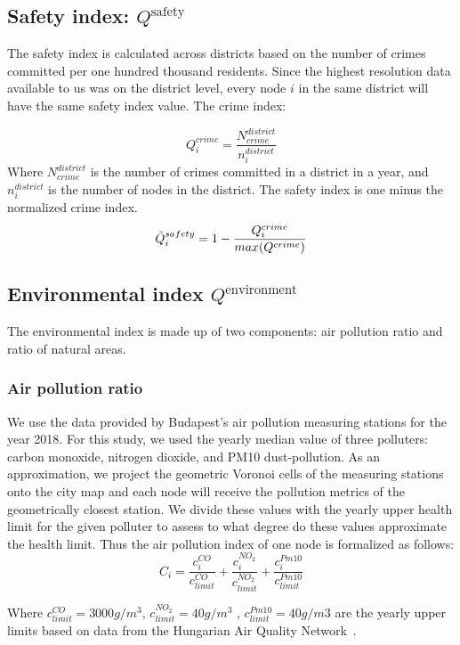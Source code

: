 \subsection{Safety index: \texorpdfstring{$Q^{\text{safety}}$}{Q\^safety}} \label{safety}

The safety index is calculated across districts based on the number of crimes committed per one hundred thousand residents. Since the highest resolution data available to us was on the district level, every node $i$ in the same district will have the same safety index value. The crime index:

$$Q_i^{crime}=\frac{N^{district}_{crime}}{n_i^{district}}$$
Where $N^{district}_{crime}$ is the number of crimes committed in a district in a year, and $n_i^{district}$ is the number of nodes in the district. The safety index is one minus the normalized crime index.
\begin{equation}
	\Tilde{Q}_i^{safety}=1-\frac{Q_i^{crime}}{max(Q^{crime})}
\end{equation}

\subsection{Environmental index  \texorpdfstring{$Q^{\text{environment}}$}{Q\^environment}} \label{environment}

The environmental index is made up of two components: air pollution ratio and ratio of natural areas.

\subsubsection{Air pollution ratio}
We use the data provided by Budapest’s air pollution measuring stations for the year 2018. For this study, we used the yearly median value of three polluters: carbon monoxide, nitrogen dioxide, and PM10 dust-pollution.
As an approximation, we project the geometric Voronoi cells of the measuring stations onto the city map and each node will receive the pollution metrics of the geometrically closest station. We divide these values with the yearly upper health limit for the given polluter to assess to what degree do these values approximate the health limit. Thus the air pollution index of one node is formalized as follows:
$$C_i=\frac{c_i^{CO}}{c_{limit}^{CO}}+\frac{c_i^{NO_2}}{c_{limit}^{NO_2}}+\frac{c_i^{Pm10}}{c_{limit}^{Pm10}}$$

Where $c^{CO}_{limit}=3000 g/m^3$, $c^{NO_2}_{limit}=40 g/m^3$ , $c^{Pm10}_{limit}=40 g/m3$ are the yearly upper limits based on data from the Hungarian Air Quality Network~\cite{HU2019Pollution}.

